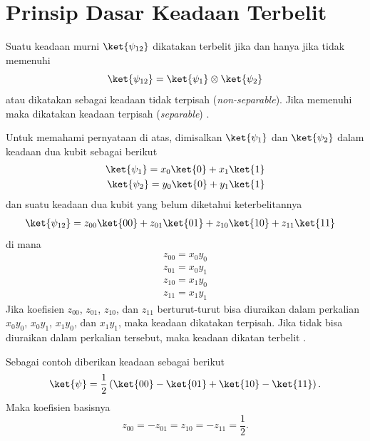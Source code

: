 \section{Prinsip Dasar Keadaan Terbelit}
\par
Suatu keadaan murni $\ket{\psi_{12}}$ dikatakan terbelit jika dan hanya jika tidak memenuhi
\begin{equation}
	\ket{\psi_{12}}=\ket{\psi_1}\otimes\ket{\psi_2}
\end{equation}
atau dikatakan sebagai keadaan tidak terpisah (\textit{non-separable}). Jika memenuhi maka dikatakan keadaan terpisah (\textit{separable}) \cite{esteve2004quantum}.
\par
Untuk memahami pernyataan di atas, dimisalkan $\ket{\psi_1}$ dan $\ket{\psi_2}$ dalam keadaan dua kubit sebagai berikut
\begin{equation}
	\begin{aligned}
		\ket{\psi_1}=x_0\ket{0}+x_1\ket{1}\\
		\ket{\psi_2}=y_0\ket{0}+y_1\ket{1}
	\end{aligned}
\end{equation}
dan suatu keadaan dua kubit yang belum diketahui keterbelitannya
\begin{equation}
	\begin{aligned}
		\ket{\psi_{12}}&=z_{00}\ket{00}+z_{01}\ket{01}+z_{10}\ket{10}+z_{11}\ket{11}
	\end{aligned}
\end{equation}
di mana
\begin{align}
    z_{00}=x_0y_0
    \label{eq:terbelit1}\\
    z_{01}=x_0y_1
    \label{eq:terbelit2}\\
    z_{10}=x_1y_0
    \label{eq:terbelit3}\\
    z_{11}=x_1y_1
    \label{eq:terbelit4}
\end{align}
Jika koefisien $z_{00}$, $z_{01}$, $z_{10}$, dan $z_{11}$ berturut-turut bisa diuraikan dalam perkalian $x_0y_0$, $x_0y_1$, $x_1y_0$, dan $x_1y_1$, maka keadaan dikatakan terpisah. Jika tidak bisa diuraikan dalam perkalian tersebut, maka keadaan dikatan terbelit \cite{taufiqi2024asymmetric}.
\par
Sebagai contoh diberikan keadaan sebagai berikut
\begin{equation}
	\ket{\psi}=\frac{1}{2}\left(\ket{00}-\ket{01}+\ket{10}-\ket{11}\right).
\end{equation}
Maka koefisien basisnya 
\begin{equation}
	z_{00}=-z_{01}=z_{10}=-z_{11}=\frac{1}{2}.
\end{equation}
